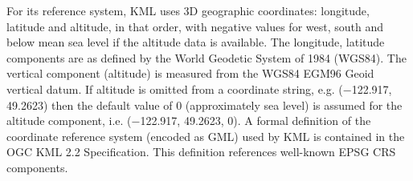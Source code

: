 For its reference system, KML uses 3D geographic coordinates: longitude, latitude and altitude, in that order, with negative values for west, south and below mean sea level if the altitude data is available. The longitude, latitude components are as defined by the World Geodetic System of 1984 (WGS84). The vertical component (altitude) is measured from the WGS84 EGM96 Geoid vertical datum. If altitude is omitted from a coordinate string, e.g. (−122.917, 49.2623) then the default value of 0 (approximately sea level) is assumed for the altitude component, i.e. (−122.917, 49.2623, 0). A formal definition of the coordinate reference system (encoded as GML) used by KML is contained in the OGC KML 2.2 Specification. This definition references well-known EPSG CRS components.
